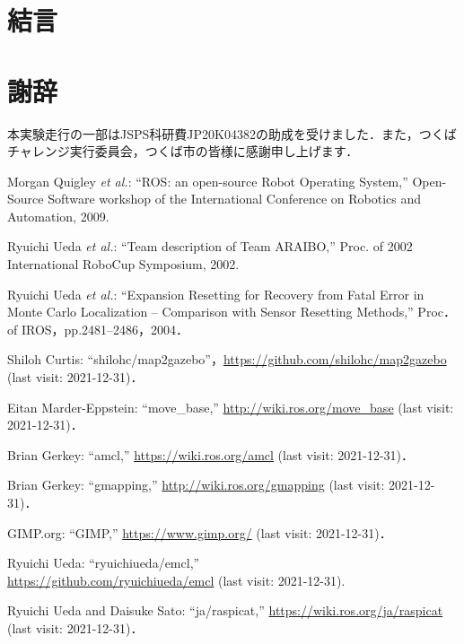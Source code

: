 \documentclass[twocolumn,9pt]{jsproceedings}
\begin{document}
\section{結言}

\section*{謝辞}

本実験走行の一部はJSPS科研費JP20K04382の助成を受けました．また，つくばチャレンジ実行委員会，つくば市の皆様に感謝申し上げます．


\footnotesize
\begin{thebibliography}{99}
	  Morgan Quigley {\it et al.}: ``ROS: an open-source Robot Operating System,'' 
Open-Source Software workshop of the International Conference on Robotics and Automation, 2009. 

	Ryuichi Ueda {\it et al.}: 
``Team description of Team ARAIBO,'' 
Proc. of 2002 International RoboCup Symposium, 2002. 

	Ryuichi Ueda {\it et al.}: 
  ``Expansion Resetting for Recovery from Fatal Error in Monte Carlo Localization -- Comparison with Sensor Resetting Methods,'' Proc．of IROS，pp.2481--2486，2004．
  
  Shiloh Curtis: ``shilohc/map2gazebo''，\url{https://github.com/shilohc/map2gazebo} (last visit: 2021-12-31)．
  
  Eitan Marder-Eppstein: ``move\_base,'' \url{http://wiki.ros.org/move_base} (last visit: 2021-12-31)．
  
  Brian Gerkey: ``amcl,'' \url{https://wiki.ros.org/amcl} (last visit: 2021-12-31)．

  Brian Gerkey: ``gmapping,'' \url{http://wiki.ros.org/gmapping} (last visit: 2021-12-31)．
  
  GIMP.org: ``GIMP,'' \url{https://www.gimp.org/} (last visit: 2021-12-31)．
  
  Ryuichi Ueda: ``ryuichiueda/emcl,''\\\url{https://github.com/ryuichiueda/emcl} (last visit: 2021-12-31).
  
  Ryuichi Ueda and Daisuke Sato: ``ja/raspicat,'' \url{https://wiki.ros.org/ja/raspicat} (last visit: 2021-12-31)．
  

\end{thebibliography}
\end{document}
